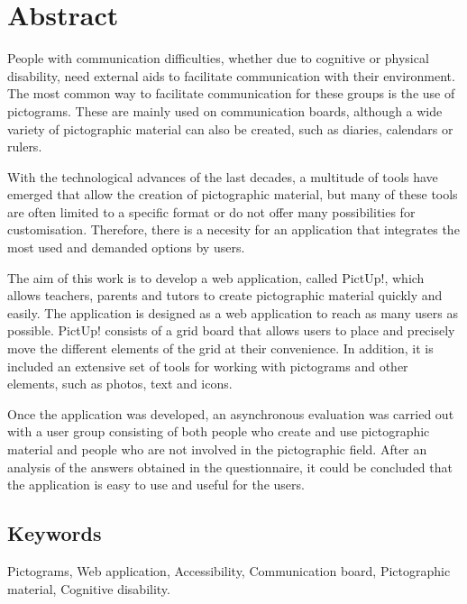 \chapter*{Abstract}

People with communication difficulties, whether due to cognitive or physical disability, need external aids to facilitate communication with their environment. The most common way to facilitate communication for these groups is the use of pictograms. These are mainly used on communication boards, although a wide variety of pictographic material can also be created, such as diaries, calendars or rulers.

With the technological advances of the last decades, a multitude of tools have emerged that allow the creation of pictographic material, but many of these tools are often limited to a specific format or do not offer many possibilities for customisation.  Therefore, there is a necesity for an application that integrates the most used and demanded options by users. 

The aim of this work is to develop a web application, called PictUp!, which allows teachers, parents and tutors to create pictographic material quickly and easily. The application is designed as a web application to reach as many users as possible. PictUp! consists of a grid board that allows users to place and precisely move the different elements of the grid at their convenience. In addition, it is included an extensive set of tools for working with pictograms and other elements, such as photos, text and icons.

Once the application was developed, an asynchronous evaluation was carried out with a user group consisting of both people who create and use pictographic material and people who are not involved in the pictographic field. After an analysis of the answers obtained in the questionnaire, it could be concluded that the application is easy to use and useful for the users.

\section*{Keywords}

\noindent Pictograms, Web application, Accessibility, Communication board, Pictographic material, Cognitive disability.



